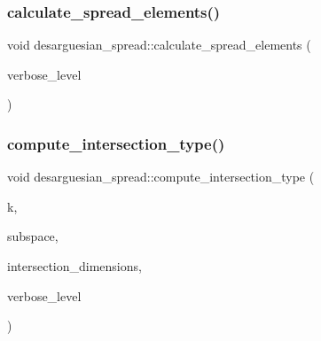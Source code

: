 \subsubsection{\texorpdfstring{calculate\+\_\+spread\+\_\+elements()}{calculate\_spread\_elements()}}
{\footnotesize\ttfamily void desarguesian\+\_\+spread\+::calculate\+\_\+spread\+\_\+elements (\begin{DoxyParamCaption}\item[{\mbox{\hyperlink{galois_8h_a09fddde158a3a20bd2dcadb609de11dc}{I\+NT}}}]{verbose\+\_\+level }\end{DoxyParamCaption})}

\mbox{\label{classdesarguesian__spread_a7eca8625c43342d9f0608fe1235fce2c}} 
\subsubsection{\texorpdfstring{compute\+\_\+intersection\+\_\+type()}{compute\_intersection\_type()}}
{\footnotesize\ttfamily void desarguesian\+\_\+spread\+::compute\+\_\+intersection\+\_\+type (\begin{DoxyParamCaption}\item[{\mbox{\hyperlink{galois_8h_a09fddde158a3a20bd2dcadb609de11dc}{I\+NT}}}]{k,  }\item[{\mbox{\hyperlink{galois_8h_a09fddde158a3a20bd2dcadb609de11dc}{I\+NT}} $\ast$}]{subspace,  }\item[{\mbox{\hyperlink{galois_8h_a09fddde158a3a20bd2dcadb609de11dc}{I\+NT}} $\ast$}]{intersection\+\_\+dimensions,  }\item[{\mbox{\hyperlink{galois_8h_a09fddde158a3a20bd2dcadb609de11dc}{I\+NT}}}]{verbose\+\_\+level }\end{DoxyParamCaption})}

\mbox{\label{classdesarguesian__spread_a3ae1799cf7300894df22685686584bac}} 
